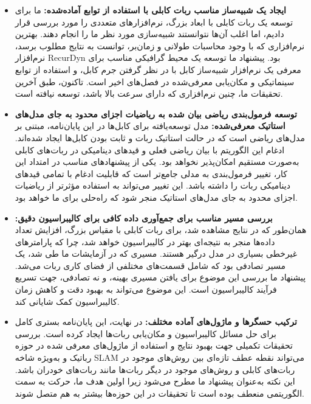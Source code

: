 \begin{itemize}
\item \textbf{ایجاد یک شبیه‌ساز مناسب ربات کابلی با استفاده از توابع آماده‌شده:}
ما برای توسعه یک ربات کابلی با ابعاد بزرگ، نرم‌افزارهای متعددی را مورد بررسی قرار دادیم، اما اغلب آن‌ها نتوانستند شبیه‌سازی مورد نظر ما را انجام دهند. بهترین نرم‌افزاری که با وجود محاسبات طولانی و زمان‌بر، توانست به نتایج مطلوب برسد، نرم‌افزار RecurDyn بود. پیشنهاد ما توسعه یک محیط گرافیکی مناسب برای معرفی یک نرم‌افزار شبیه‌ساز کابل با در نظر گرفتن جرم کابل، و استفاده از توابع سینماتیکی و مکان‌یابی معرفی‌شده در فصل‌های اخیر است. تاکنون، طبق آخرین تحقیقات ما، چنین نرم‌افزاری که دارای سرعت بالا باشد، توسعه نیافته است.

\item \textbf{توسعه فرمول‌بندی ریاضی بیان شده به ریاضیات اجزای محدود به جای مدل‌های استاتیک معرفی‌شده:}
مدل توسعه‌یافته برای کابل‌ها در این پایان‌نامه، مبتنی بر مدل‌های ریاضی است که در حالت استاتیک ربات و ثابت بودن کابل‌ها ایجاد شده‌اند. ادغام این الگوریتم با بیان ریاضی فعلی و قیدهای دینامیکی در ربات‌های کابلی به‌صورت مستقیم امکان‌پذیر نخواهد بود. یکی از پیشنهادهای مناسب در امتداد این کار، تغییر فرمول‌بندی به مدلی جامع‌تر است که قابلیت ادغام با تمامی قیدهای دینامیکی ربات را داشته باشد. این تغییر می‌تواند به استفاده مؤثرتر از ریاضیات اجزای محدود به جای مدل‌های استاتیک منجر شود که راه‌حلی برای ما خواهد بود.

\item \textbf{بررسی مسیر مناسب برای جمع‌آوری داده کافی برای کالیبراسیون دقیق:}
همان‌طور که در نتایج مشاهده شد، برای ربات کابلی با مقیاس بزرگ، افزایش تعداد داده‌ها منجر به نتیجه‌ای بهتر در کالیبراسیون خواهد شد، چرا که پارامترهای غیرخطی بسیاری در مدل درگیر هستند. مسیری که در آزمایشات ما طی شد، یک مسیر تصادفی بود که شامل قسمت‌های مختلفی از فضای کاری ربات می‌شد. پیشنهاد ما بررسی این موضوع برای یافتن مسیری بهینه، و نه تصادفی، جهت تسریع فرآیند کالیبراسیون است. این موضوع می‌تواند به بهبود دقت و کاهش زمان کالیبراسیون کمک شایانی کند.


\item \textbf{ترکیب حسگر‌ها و ماژول‌های آماده مختلف:}
در نهایت، این پایان‌نامه بستری کامل برای حل مسائل کالیبراسیون و مکان‌یابی ربات‌ها ایجاد کرده است. بررسی تحقیقات تکمیلی جهت بهبود نتایج و استفاده از ماژول‌های معرفی شده در حوزه رباتیک و به‌ویژه شاخه SLAM می‌تواند نقطه عطف تازه‌ای بین روش‌های موجود در ربات‌های کابلی و روش‌های موجود در دیگر ربات‌ها مانند ربات‌های خودران باشد. این نکته به‌عنوان پیشنهاد ما مطرح می‌شود زیرا اولین هدف ما، حرکت به سمت الگوریتمی منعطف بوده است تا تحقیقات در این حوزه‌ها بیشتر به هم متصل شوند.


\end{itemize}
